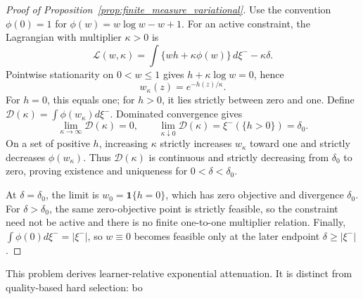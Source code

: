 \begin{proof}[Proof of Proposition~\ref{prop:finite_measure_variational}]
Use the convention
\(\phi(0)=1\) for
\(\phi(w)=w\log w-w+1\). For an active constraint, the Lagrangian with
multiplier \(\kappa>0\) is
\[
\mathcal L(w,\kappa)
=\int\{wh+\kappa\phi(w)\}\,d\xi^- -\kappa\delta.
\]
Pointwise stationarity on \(0<w\le1\) gives
\(h+\kappa\log w=0\), hence
\[
w_\kappa(z)=e^{-h(z)/\kappa}.
\]
For \(h=0\), this equals one; for \(h>0\), it lies strictly between
zero and one. Define
\(\mathcal D(\kappa)=\int\phi(w_\kappa)d\xi^-\). Dominated convergence gives
\[
\lim_{\kappa\to\infty}\mathcal D(\kappa)=0,
\qquad
\lim_{\kappa\downarrow0}\mathcal D(\kappa)
=\xi^-(\{h>0\})=\delta_0.
\]
On a set of positive \(h\), increasing \(\kappa\) strictly increases
\(w_\kappa\) toward one and strictly decreases \(\phi(w_\kappa)\).
Thus \(\mathcal D(\kappa)\) is continuous and strictly decreasing from
\(\delta_0\) to zero, proving existence and uniqueness for
\(0<\delta<\delta_0\).

At \(\delta=\delta_0\), the limit is
\(w_0=\mathbf1\{h=0\}\), which has zero objective and divergence
\(\delta_0\). For \(\delta>\delta_0\), the same zero-objective point is
strictly feasible, so the constraint need not be active and there is no
finite one-to-one multiplier relation. Finally,
\(\int\phi(0)d\xi^-=|\xi^-|\), so \(w\equiv0\) becomes feasible only at the later
endpoint \(\delta\ge|\xi^-|\).
\end{proof}

This problem derives learner-relative exponential attenuation. It is
distinct from quality-based hard selection: bo